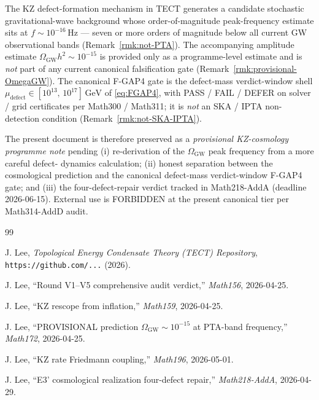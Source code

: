 The KZ defect-formation mechanism in TECT generates a candidate
stochastic gravitational-wave background whose order-of-magnitude
peak-frequency estimate sits at $f \sim 10^{-16}\,\mathrm{Hz}$ ---
seven or more orders of magnitude below all current GW observational
bands (Remark~\ref{rmk:not-PTA}). The accompanying amplitude
estimate $\Omega_{\mathrm{GW}}h^2 \sim 10^{-15}$ is provided only as
a programme-level estimate and is \emph{not} part of any current
canonical falsification gate (Remark~\ref{rmk:provisional-OmegaGW}).
The canonical F-GAP4 gate is the defect-mass verdict-window shell
$\mu_{\mathrm{defect}} \in [10^{13},\,10^{17}]\,\mathrm{GeV}$ of
\eqref{eq:FGAP4}, with PASS / FAIL / DEFER on solver / grid
certificates per Math300 / Math311; it is \emph{not} an SKA / IPTA
non-detection condition (Remark~\ref{rmk:not-SKA-IPTA}).

The present document is therefore preserved as a \emph{provisional
KZ-cosmology programme note} pending (i) re-derivation of the
$\Omega_{\mathrm{GW}}$ peak frequency from a more careful defect-
dynamics calculation; (ii) honest separation between the cosmological
prediction and the canonical defect-mass verdict-window F-GAP4 gate;
and (iii) the four-defect-repair verdict tracked in Math218-AddA
(deadline 2026-06-15). External use is FORBIDDEN at the present
canonical tier per Math314-AddD audit.

\begin{thebibliography}{99}

J. Lee, \textit{Topological Energy Condensate Theory (TECT) Repository},
\texttt{https://github.com/...} (2026).

J. Lee, ``Round V1–V5 comprehensive audit verdict,''
\textit{Math156}, 2026-04-25.

J. Lee, ``KZ rescope from inflation,''
\textit{Math159}, 2026-04-25.

J. Lee, ``PROVISIONAL prediction $\Omega_{\mathrm{GW}} \sim 10^{-15}$ at PTA-band frequency,''
\textit{Math172}, 2026-04-25.

J. Lee, ``KZ rate Friedmann coupling,''
\textit{Math196}, 2026-05-01.

J. Lee, ``E3' cosmological realization four-defect repair,''
\textit{Math218-AddA}, 2026-04-29.

\end{thebibliography}



